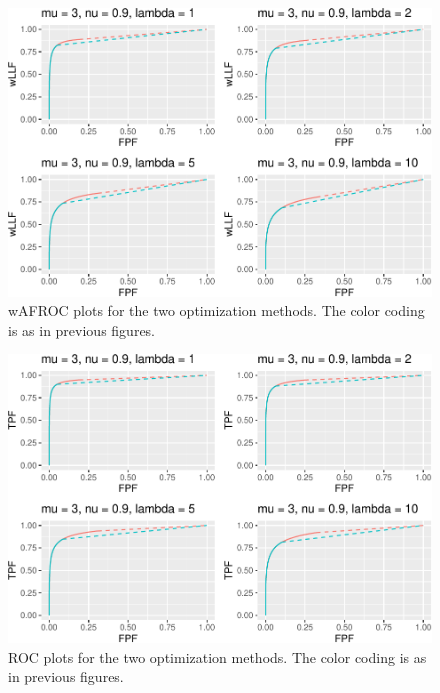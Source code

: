 \documentclass[
]{book}
\begin{document}
\begin{figure}
\centering
\includegraphics{21-optim-op-point_files/figure-latex/optim-op-point-high-performance-vary-lambda-vary-all-wafroc-1.pdf}
\caption{\label{fig:optim-op-point-high-performance-vary-lambda-vary-all-wafroc}wAFROC plots for the two optimization methods. The color coding is as in previous figures.}
\end{figure}

\begin{figure}
\centering
\includegraphics{21-optim-op-point_files/figure-latex/optim-op-point-high-performance-vary-lambda-vary-all-roc-1.pdf}
\caption{\label{fig:optim-op-point-high-performance-vary-lambda-vary-all-roc}ROC plots for the two optimization methods. The color coding is as in previous figures.}
\end{figure}
\end{document}
